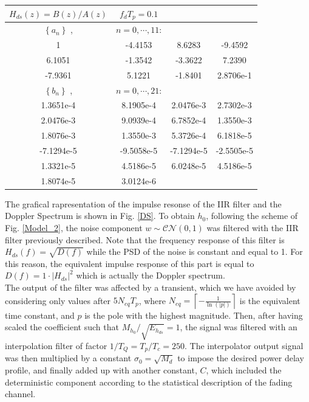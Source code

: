 \documentclass[a4paper, 12pt]{report}
\begin{document}
\begin{center}
	\begin{table}[h]
		\centering
		\begin{tabular}{c c c c}
			\toprule
			\textbf{$H_{ds}(z) = B(z)/A(z)$} & $f_dT_p=0.1$ &  &     \\
			\midrule
			$\left\lbrace a_n \right\rbrace$ ,& $n=0,\cdots,11$:  & & \\
			1 & -4.4153 & 8.6283 & -9.4592   \\
		    6.1051 & -1.3542 & -3.3622 & 7.2390 \\
		    -7.9361 & 5.1221 & -1.8401 & 2.8706e-1 \\
		    \midrule
		    $\left\lbrace b_n \right\rbrace$ ,& $n=0,\cdots,21$:  & & \\
		    1.3651e-4 & 8.1905e-4 & 2.0476e-3 & 2.7302e-3 \\
		    2.0476e-3 & 9.0939e-4 & 6.7852e-4 & 1.3550e-3 \\
		    1.8076e-3 & 1.3550e-3 & 5.3726e-4 & 6.1818e-5 \\
		    -7.1294e-5 & -9.5058e-5 & -7.1294e-5 & -2.5505e-5 \\
		    1.3321e-5 & 4.5186e-5 & 6.0248e-5 & 4.5186e-5 \\
		    1.8074e-5  & 3.0124e-6  & & \\
		    \bottomrule			
	    \end{tabular}
	\end{table}
\end{center} 

The grafical rapresentation of the impulse resonse of the IIR filter and the Doppler Spectrum is shown in Fig. \ref{DS}. 
To obtain $h_0$, following the scheme of Fig. \ref{Model_2}, the noise component $w\sim \mathcal{CN}(0,1)$ was filtered with the IIR filter previously described. Note that the frequency response of this filter is $H_{ds}(f)=\sqrt{D(f)}$ while the PSD of the noise is constant and equal to 1. For this reason, the equivalent impulse response of this part is equal to $D(f)=1\cdot |H_{ds}|^2$ which is actually the Doppler spectrum. \\
The output of the filter was affected by a transient, which we have avoided by considering only values after $5N_{eq}T_p$, where $N_{eq} = \left\lceil -\frac{1}{\ln(|p|)} \right\rceil$ is the equivalent time constant, and $p$ is the pole with the highest magnitude. Then, after having scaled the coefficient such that $M_{h_0}/\sqrt{E_{h_{ds}}}=1$, the signal was filtered with an interpolation filter of factor $1/T_Q = T_p/T_c=250$. The interpolator output signal was then multiplied by a constant $\sigma_0 = \sqrt{M_d}$ to impose the desired power delay profile, and finally added up with another constant, $C$, which included the deterministic component according to the statistical description of the fading channel.
\end{document}
